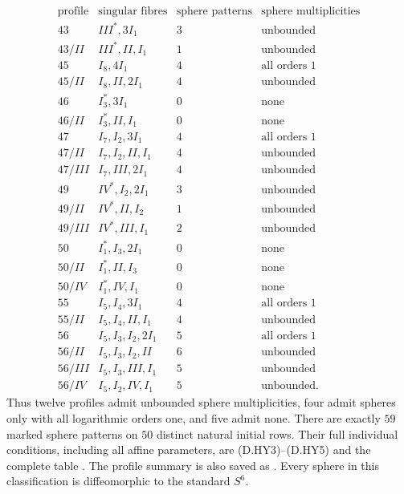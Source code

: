 \[
\begin{array}{c|l|r|l}
\text{profile}&\text{singular fibres}&\text{sphere patterns}
                     &\text{sphere multiplicities}\\\hline
43&III^*,3I_1&3&\text{unbounded}\\
43/II&III^*,II,I_1&1&\text{unbounded}\\
45&I_8,4I_1&4&\text{all orders }1\\
45/II&I_8,II,2I_1&4&\text{unbounded}\\
46&I_3^*,3I_1&0&\text{none}\\
46/II&I_3^*,II,I_1&0&\text{none}\\
47&I_7,I_2,3I_1&4&\text{all orders }1\\
47/II&I_7,I_2,II,I_1&4&\text{unbounded}\\
47/III&I_7,III,2I_1&4&\text{unbounded}\\
49&IV^*,I_2,2I_1&3&\text{unbounded}\\
49/II&IV^*,II,I_2&1&\text{unbounded}\\
49/III&IV^*,III,I_1&2&\text{unbounded}\\
50&I_1^*,I_3,2I_1&0&\text{none}\\
50/II&I_1^*,II,I_3&0&\text{none}\\
50/IV&I_1^*,IV,I_1&0&\text{none}\\
55&I_5,I_4,3I_1&4&\text{all orders }1\\
55/II&I_5,I_4,II,I_1&4&\text{unbounded}\\
56&I_5,I_3,I_2,2I_1&5&\text{all orders }1\\
56/II&I_5,I_3,I_2,II&6&\text{unbounded}\\
56/III&I_5,I_3,III,I_1&5&\text{unbounded}\\
56/IV&I_5,I_2,IV,I_1&5&\text{unbounded}.
\end{array}                                                  \tag{D.ST13}
\]
Thus twelve profiles admit unbounded sphere multiplicities,
four admit spheres only with all logarithmic orders one, and
five admit none. There are exactly $59$ marked sphere patterns
on $50$ distinct natural initial rows. Their full individual
conditions, including all affine parameters, are (D.HY3)--(D.HY5)
and the complete table
.
The profile summary is also saved as
.
Every sphere in this classification is diffeomorphic to the
standard $S^6$.

